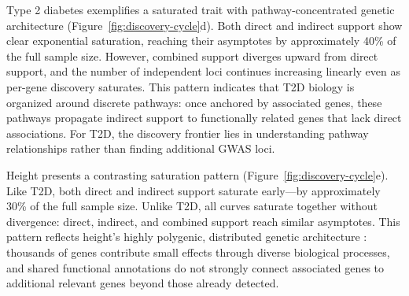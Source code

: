 Type 2 diabetes exemplifies a saturated trait with pathway-concentrated genetic architecture (Figure~\ref{fig:discovery-cycle}d). Both direct and indirect support show clear exponential saturation, reaching their asymptotes by approximately 40\% of the full sample size. However, combined support diverges upward from direct support, and the number of independent loci continues increasing linearly even as per-gene discovery saturates. This pattern indicates that T2D biology is organized around discrete pathways: once anchored by associated genes, these pathways propagate indirect support to functionally related genes that lack direct associations. For T2D, the discovery frontier lies in understanding pathway relationships rather than finding additional GWAS loci.

Height presents a contrasting saturation pattern (Figure~\ref{fig:discovery-cycle}e). Like T2D, both direct and indirect support saturate early---by approximately 30\% of the full sample size. Unlike T2D, all curves saturate together without divergence: direct, indirect, and combined support reach similar asymptotes. This pattern reflects height's highly polygenic, distributed genetic architecture \cite{yengo_saturated_2022}: thousands of genes contribute small effects through diverse biological processes, and shared functional annotations do not strongly connect associated genes to additional relevant genes beyond those already detected.


